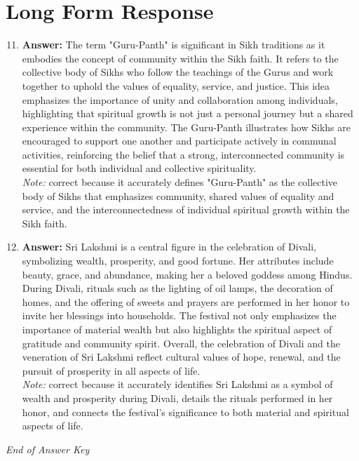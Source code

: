 \documentclass[12pt]{article}
\begin{document}
\section*{Long Form Response}
\begin{enumerate}[label=\arabic*.]
\setcounter{enumi}{10}
\item \textbf{Answer:} The term "Guru-Panth" is significant in Sikh traditions as it embodies the concept of community within the Sikh faith. It refers to the collective body of Sikhs who follow the teachings of the Gurus and work together to uphold the values of equality, service, and justice. This idea emphasizes the importance of unity and collaboration among individuals, highlighting that spiritual growth is not just a personal journey but a shared experience within the community. The Guru-Panth illustrates how Sikhs are encouraged to support one another and participate actively in communal activities, reinforcing the belief that a strong, interconnected community is essential for both individual and collective spirituality.
\\ \textit{Note:} correct because it accurately defines "Guru-Panth" as the collective body of Sikhs that emphasizes community, shared values of equality and service, and the interconnectedness of individual spiritual growth within the Sikh faith.
\item \textbf{Answer:} Sri Lakshmi is a central figure in the celebration of Divali, symbolizing wealth, prosperity, and good fortune. Her attributes include beauty, grace, and abundance, making her a beloved goddess among Hindus. During Divali, rituals such as the lighting of oil lamps, the decoration of homes, and the offering of sweets and prayers are performed in her honor to invite her blessings into households. The festival not only emphasizes the importance of material wealth but also highlights the spiritual aspect of gratitude and community spirit. Overall, the celebration of Divali and the veneration of Sri Lakshmi reflect cultural values of hope, renewal, and the pursuit of prosperity in all aspects of life.
\\ \textit{Note:} correct because it accurately identifies Sri Lakshmi as a symbol of wealth and prosperity during Divali, details the rituals performed in her honor, and connects the festival's significance to both material and spiritual aspects of life.
\end{enumerate}

\vfill
\noindent\textit{End of Answer Key}
\end{document}
